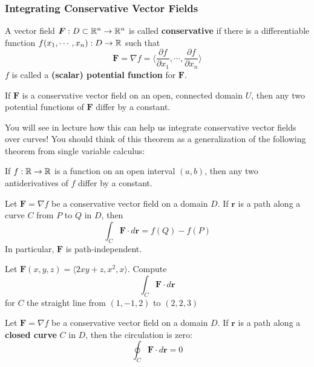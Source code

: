 \subsubsection{Integrating Conservative Vector Fields}

\begin{definition}
    A vector field $\bm{F} : D \subset \mathbb{R}^n \to \mathbb{R}^n$ is called \textbf{conservative} if there is a differentiable function $f(x_1,\cdots, x_n) : D \to \mathbb{R}$ such that $$\bm{F} = \nabla f = \langle \frac{\partial f}{\partial x_1}, \cdots , \frac{\partial f}{\partial x_n} \rangle$$
    $f$ is called a \textbf{(scalar) potential function} for $\bm{F}$.
    \end{definition}
    
    \begin{theorem}\label{uniquenesspotential}
    If $\bm{F}$ is a conservative vector field on an open, connected domain $U$, then any two potential functions of $\bm{F}$ differ by a constant.
    \end{theorem}

    You will see in lecture how this can help us integrate conservative vector fields over curves! You should think of this theorem as a generalization of the following theorem from single variable calculus: 

    \begin{theorem}
    If $f: \mathbb{R} \to \mathbb{R}$ is a function on an open interval $(a,b)$, then any two antiderivatives of $f$ differ by a constant.
    \end{theorem}

\begin{theorem}
    Let $\bm{F} = \nabla f$ be a conservative vector field on a domain $D$. If $\bm{r}$ is a path along a curve $C$ from $P$ to $Q$ in $D$, then $$\int_C \bm{F} \cdot d\bm{r} = f(Q) - f(P)$$
    In particular, $\bm{F}$ is path-independent.
    \end{theorem}


\begin{example}
    Let $\bm{F}(x,y,z) = \langle 2xy + z, x^2, x \rangle$.  Compute $$\int_C \bm{F} \cdot d\bm{r}$$ for $C$ the straight line from $(1,-1,2)$ to $(2,2,3)$
\end{example}

\begin{corollary}
    Let $\bm{F} = \nabla f$ be a conservative vector field on a domain $D$. If $\bm{r}$ is a path along a \textbf{closed curve} $C$ in $D$, then the circulation is zero:
    $$\oint_C \bm{F} \cdot d\bm{r} = 0$$
    \end{corollary}

